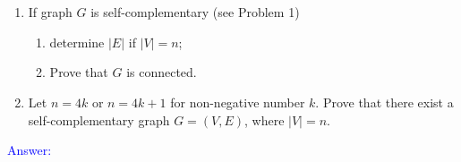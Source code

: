 \documentclass[a4paper]{article}
\begin{document}
\section{}
\begin{enumerate}[label=\alph*)]
    \item  If graph $G$ is self-complementary (see Problem 1) 
        \begin{enumerate}[label=(\roman*)]
            \item determine $|E|$ if $|V| = n$;
            \item Prove that $G$ is connected.
        \end{enumerate}
    \item Let $n = 4k$ or $n = 4k + 1$ for non-negative number $k$. Prove that there exist a self-complementary graph $G = (V,E)$, where $|V| = n$.
\end{enumerate}
\textcolor{blue}{Answer:} 
\end{document}
